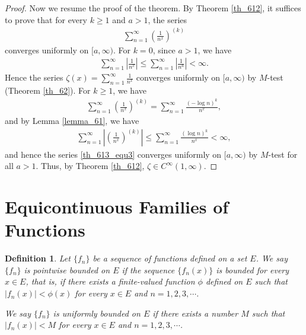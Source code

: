 \documentclass[10pt]{book}
\newtheorem{definition}{Definition}[chapter]
\theoremstyle{definition}
\numberwithin{equation}{chapter}
\begin{document}
\begin{proof}
\medskip

Now we resume the proof of the theorem. By Theorem \ref{th_612}, it suffices to prove that for every $k \geq 1$ and $a > 1$, the series
\begin{align}\label{th_613_equ3}
    \sum^\infty_{n=1} \left(\frac{1}{n^x}\right)^{(k)}
\end{align}
converges uniformly on $[a,\infty)$. For $k = 0$, since $a > 1$, we have
\begin{align*}
    \sum^\infty_{n=1} \left|\frac{1}{n^x}\right| \leq \sum^\infty_{n=1} \left|\frac{1}{n^a}\right| < \infty.
\end{align*}
Hence the series $\zeta(x) = \sum^\infty_{n=1} \frac{1}{n^x}$ converges uniformly on $[a,\infty)$ by $M$-test (Theorem \ref{th_62}). For $k \geq 1$, we have
\begin{align*}
    \sum^\infty_{n=1} \left(\frac{1}{n^x}\right)^{(k)} = \sum^\infty_{n=1} \frac{(- \log n)^k}{n^x},
\end{align*}
and by Lemma \ref{lemma_61}, we have
\begin{align*}
    \sum^\infty_{n=1} \left|\left(\frac{1}{n^x}\right)^{(k)}\right| \leq \sum^\infty_{n=1} \frac{(\log n)^k}{n^x} < \infty,
\end{align*}
and hence the series \eqref{th_613_equ3} converges uniformly on $[a,\infty)$ by $M$-test for all $a > 1$. Thus, by Theorem \ref{th_612}, $\zeta \in C^\infty(1,\infty)$.
\end{proof}

\medskip



\section{Equicontinuous Families of Functions}

\begin{definition}
Let $\{f_n\}$ be a sequence of functions defined on a set $E$. We say $\{f_n\}$ is pointwise bounded on $E$ if the sequence $\{f_n(x)\}$ is bounded for every $x \in E$, that is, if there exists a finite-valued function $\phi$ defined on $E$ such that $\left|f_n(x)\right| < \phi(x)$ for every $x \in E$ and $n = 1,2,3,\cdots$. 

We say $\{f_n\}$ is uniformly bounded on $E$ if there exists a number $M$ such that $\left|f_n(x)\right| < M$ for every $x \in E$ and $n = 1,2,3,\cdots$. 
\end{definition}

\medskip
\end{document}
